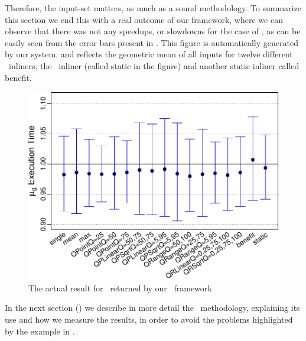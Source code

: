 Therefore, the input-set matters, as much as a sound methodology. To summarize this section we end this with a real outcome of our framework, where we can observe that there was not any speedups, or slowdowns for the case of \gcc, as can be easily seen from the error bars present in . This figure is automatically generated by our system, and reflects the geometric mean of all inputs for twelve different \FDI\ inliners, the \llvm\ inliner (called static in the figure) and another static inliner called benefit.

\begin{figure}
  \centering
  \includegraphics[width=1.00\linewidth]{Figures/gcc-results}
  \caption{The actual result for \gcc\ returned by our \CP\ framework}
  \label{fig:gcc-results}
\end{figure}


In the next section () we describe in more detail the \CP\ methodology, explaining its use and how we measure the results, in order to avoid the problems highlighted by the example in .
